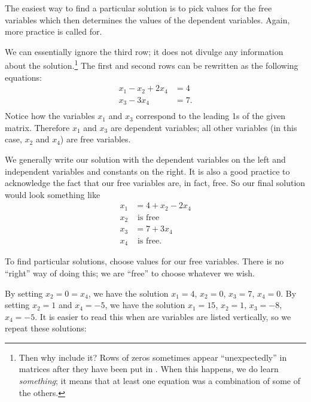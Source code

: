 The easiest way to find a particular solution is to pick values for the free variables which then determines the values of the dependent variables. Again, more practice is called for.

\medskip

{We can essentially ignore the third row; it does not divulge any information about the solution.\footnote{Then why include it? Rows of zeros sometimes appear ``unexpectedly'' in matrices after they have been put in \rref. When this happens, we do learn \textit{something}; it means that at least one equation was a combination of some of the others.} 
 The first and second rows can be rewritten as the following equations: \begin{align*} x_1 - x_2 + 2x_4 &=4 \\ x_3 - 3x_4 &= 7. \\ \end{align*} Notice how the variables $x_1$ and $x_3$ correspond to the leading 1s of the given matrix. Therefore $x_1$ and $x_3$ are dependent variables; all other variables (in this case, $x_2$ and $x_4$) are free variables.

We generally write our solution with the dependent variables on the left and independent variables and constants on the right. It is also a good practice to acknowledge the fact that our free variables are, in fact, free. So our final solution would look something like \begin{align*} x_1 &= 4 +x_2 - 2x_4 \\ x_2 & \text{ is free} \\ x_3 &= 7+3x_4 \\ x_4 & \text{ is free}.\end{align*}

To find particular solutions, choose values for our free variables. There is no ``right'' way of doing this; we are ``free'' to choose whatever we wish. 


By setting $x_2 = 0 = x_4$, we have the solution $x_1 = 4$, $x_2 = 0$, $x_3 = 7$, $x_4 = 0$. By setting $x_2 = 1$ and $x_4 = -5$, we have the solution $x_1 = 15$, $x_2 = 1$, $x_3 = -8$, $x_4 = -5$. It is easier to read this when are variables are listed vertically, so we repeat these solutions:

}
